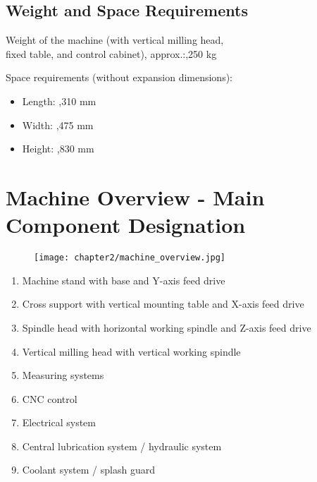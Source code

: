 
\subsection{Weight and Space Requirements}
Weight of the machine (with vertical milling head, \\
fixed table, and control cabinet), approx.:,250 kg

\vspace{0.5cm}
\noindent Space requirements (without expansion dimensions):
\begin{itemize}
    \item Length: ,310 mm
    \item Width: ,475 mm
    \item Height: ,830 mm
\end{itemize}

\section{Machine Overview - Main Component Designation}

\begin{figure}[h]
    \centering
    \texttt{[image: chapter2/machine\_overview.jpg]}
    \caption{}
    \label{fig:machine_overview}
\end{figure}

\vspace{3cm}

\begin{enumerate}[itemsep=1pt,parsep=0pt]
    \item Machine stand with base and Y-axis feed drive
    \item Cross support with vertical mounting table and X-axis feed drive
    \item Spindle head with horizontal working spindle and Z-axis feed drive
    \item Vertical milling head with vertical working spindle
    \item Measuring systems
    \item CNC control
    \item Electrical system
    \item Central lubrication system / hydraulic system
    \item Coolant system / splash guard
\end{enumerate}

